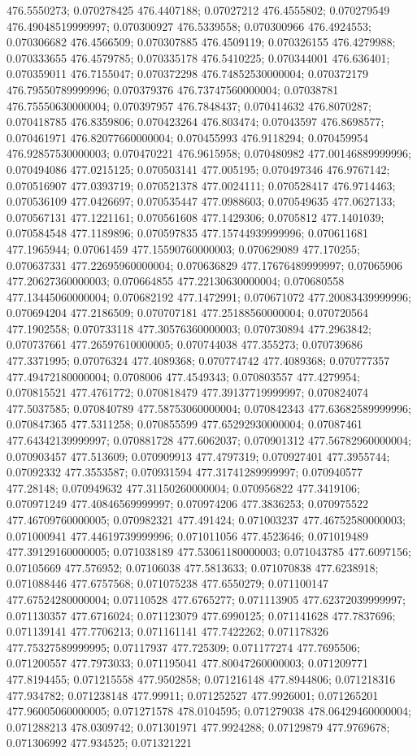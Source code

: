 476.5550273; 0.070278425 476.4407188; 0.07027212 476.4555802; 0.070279549 476.49048519999997; 0.070300927 476.5339558; 0.070300966 476.4924553; 0.070306682 476.4566509; 0.070307885 476.4509119; 0.070326155 476.4279988; 0.070333655 476.4579785; 0.070335178 476.5410225; 0.070344001 476.636401; 0.070359011 476.7155047; 0.070372298 476.74852530000004; 0.070372179 476.79550789999996; 0.070379376 476.73747560000004; 0.07038781 476.75550630000004; 0.070397957 476.7848437; 0.070414632 476.8070287; 0.070418785 476.8359806; 0.070423264 476.803474; 0.07043597 476.8698577; 0.070461971 476.82077660000004; 0.070455993 476.9118294; 0.070459954 476.92857530000003; 0.070470221 476.9615958; 0.070480982 477.00146889999996; 0.070494086 477.0215125; 0.070503141 477.005195; 0.070497346 476.9767142; 0.070516907 477.0393719; 0.070521378 477.0024111; 0.070528417 476.9714463; 0.070536109 477.0426697; 0.070535447 477.0988603; 0.070549635 477.0627133; 0.070567131 477.1221161; 0.070561608 477.1429306; 0.0705812 477.1401039; 0.070584548 477.1189896; 0.070597835 477.15744939999996; 0.070611681 477.1965944; 0.07061459 477.15590760000003; 0.070629089 477.170255; 0.070637331 477.22695960000004; 0.070636829 477.17676489999997; 0.07065906 477.20627360000003; 0.070664855 477.22130630000004; 0.070680558 477.13445060000004; 0.070682192 477.1472991; 0.070671072 477.20083439999996; 0.070694204 477.2186509; 0.070707181 477.25188560000004; 0.070720564 477.1902558; 0.070733118 477.30576360000003; 0.070730894 477.2963842; 0.070737661 477.26597610000005; 0.070744038 477.355273; 0.070739686 477.3371995; 0.07076324 477.4089368; 0.070774742 477.4089368; 0.070777357 477.49472180000004; 0.0708006 477.4549343; 0.070803557 477.4279954; 0.070815521 477.4761772; 0.070818479 477.39137719999997; 0.070824074 477.5037585; 0.070840789 477.58753060000004; 0.070842343 477.63682589999996; 0.070847365 477.5311258; 0.070855599 477.65292930000004; 0.07087461 477.64342139999997; 0.070881728 477.6062037; 0.070901312 477.56782960000004; 0.070903457 477.513609; 0.070909913 477.4797319; 0.070927401 477.3955744; 0.07092332 477.3553587; 0.070931594 477.31741289999997; 0.070940577 477.28148; 0.070949632 477.31150260000004; 0.070956822 477.3419106; 0.070971249 477.40846569999997; 0.070974206 477.3836253; 0.070975522 477.46709760000005; 0.070982321 477.491424; 0.071003237 477.46752580000003; 0.071000941 477.44619739999996; 0.071011056 477.4523646; 0.071019489 477.39129160000005; 0.071038189 477.53061180000003; 0.071043785 477.6097156; 0.07105669 477.576952; 0.07106038 477.5813633; 0.071070838 477.6238918; 0.071088446 477.6757568; 0.071075238 477.6550279; 0.071100147 477.67524280000004; 0.07110528 477.6765277; 0.071113905 477.62372039999997; 0.071130357 477.6716024; 0.071123079 477.6990125; 0.071141628 477.7837696; 0.071139141 477.7706213; 0.071161141 477.7422262; 0.071178326 477.75327589999995; 0.07117937 477.725309; 0.071177274 477.7695506; 0.071200557 477.7973033; 0.071195041 477.80047260000003; 0.071209771 477.8194455; 0.071215558 477.9502858; 0.071216148 477.8944806; 0.071218316 477.934782; 0.071238148 477.99911; 0.071252527 477.9926001; 0.071265201 477.96005060000005; 0.071271578 478.0104595; 0.071279038 478.06429460000004; 0.071288213 478.0309742; 0.071301971 477.9924288; 0.07129879 477.9769678; 0.071306992 477.934525; 0.071321221 